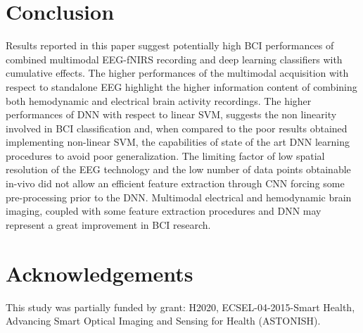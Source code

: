 \documentclass[12pt ]{iopart}
\begin{document}
\section{Conclusion}
Results reported in this paper suggest potentially high BCI performances of combined multimodal EEG-fNIRS recording and deep learning classifiers with cumulative effects. The higher performances of the multimodal acquisition with respect to standalone EEG highlight the higher information content of combining both hemodynamic and electrical brain activity recordings. The higher performances of DNN with respect to linear SVM, suggests the non linearity involved in BCI classification and, when compared to the poor results obtained implementing non-linear SVM, the capabilities of state of the art DNN learning procedures to avoid poor generalization. The limiting factor of low spatial resolution of the EEG technology and the low number of data points obtainable in-vivo  did not allow an efficient feature extraction through CNN forcing some pre-processing prior to the DNN. Multimodal electrical and hemodynamic brain imaging, coupled  with some feature extraction procedures and DNN may represent a great improvement in BCI research.

\section{Acknowledgements}
This study was partially funded by grant: H2020, ECSEL-04-2015-Smart Health, Advancing Smart Optical Imaging and Sensing for Health (ASTONISH).
 

\newpage
\printbibliography
\cleardoublepage
{}
\end{document}
